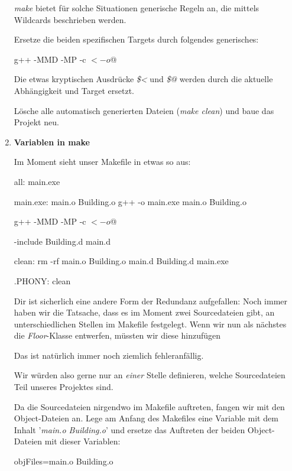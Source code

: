 \begin{enumerate}
\emph{make} bietet für solche Situationen generische Regeln an, die mittels Wildcards beschrieben werden.

Ersetze die beiden spezifischen Targets durch folgendes generisches:
\begin{lstmake}
	g++ -MMD -MP -c $< -o $@
\end{lstmake}
Die etwas kryptischen Ausdrücke \emph{\$<} und \emph{\$@} werden durch die aktuelle Abhängigkeit und Target ersetzt.

Lösche alle automatisch generierten Dateien (\emph{make clean}) und baue das Projekt neu.





\item\textbf{Variablen in make}

Im Moment sieht unser Makefile in etwas so aus:
\begin{lstmake}
all: main.exe

main.exe: main.o Building.o
	g++ -o main.exe main.o Building.o

	g++ -MMD -MP -c $< -o $@

-include Building.d main.d

clean:
	rm -rf main.o Building.o main.d Building.d main.exe
	
.PHONY: clean
\end{lstmake}

Dir ist sicherlich eine andere Form der Redundanz aufgefallen:
Noch immer haben wir die Tatsache, dass es im Moment zwei Sourcedateien gibt, an unterschiedlichen Stellen im Makefile festgelegt.
Wenn wir nun als nächstes die \emph{Floor}-Klasse entwerfen, müssten wir diese hinzufügen
Das ist natürlich immer noch ziemlich fehleranfällig.

Wir würden also gerne nur an \emph{einer} Stelle definieren, welche Sourcedateien Teil unseres Projektes sind.

Da die Sourcedateien nirgendwo im Makefile auftreten, fangen wir mit den Object-Dateien an.
Lege am Anfang des Makefiles eine Variable mit dem Inhalt '\emph{main.o Building.o}' und ersetze das Auftreten der beiden Object-Dateien mit dieser Variablen:
\begin{lstmake}
objFiles=main.o Building.o


\end{lstmake}
\end{enumerate}
